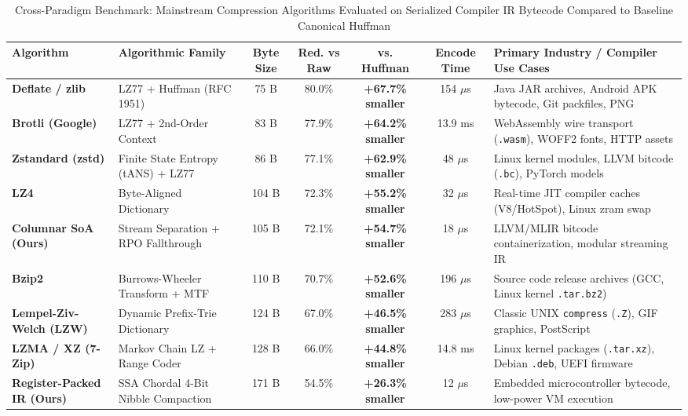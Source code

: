 \documentclass{ieeeaccess}
\begin{document}
\begin{table}[t]
\caption{Cross-Paradigm Benchmark: Mainstream Compression Algorithms Evaluated on Serialized Compiler IR Bytecode Compared to Baseline Canonical Huffman}
\label{tab:compression_comparison}
\centering
\begin{tabularx}{\textwidth}{l l c c c c X}
\toprule
\textbf{Algorithm} & \textbf{Algorithmic Family} & \textbf{Byte Size} & \textbf{Red. vs Raw} & \textbf{vs. Huffman} & \textbf{Encode Time} & \textbf{Primary Industry / Compiler Use Cases} \\
\midrule
\textbf{Deflate / zlib} & LZ77 + Huffman (RFC 1951) & 75 B & 80.0\% & \textbf{+67.7\% smaller} & 154 $\mu$s & Java JAR archives, Android APK bytecode, Git packfiles, PNG \\
\textbf{Brotli (Google)} & LZ77 + 2nd-Order Context & 83 B & 77.9\% & \textbf{+64.2\% smaller} & 13.9 ms & WebAssembly wire transport (\texttt{.wasm}), WOFF2 fonts, HTTP assets \\
\textbf{Zstandard (zstd)} & Finite State Entropy (tANS) + LZ77 & 86 B & 77.1\% & \textbf{+62.9\% smaller} & 48 $\mu$s & Linux kernel modules, LLVM bitcode (\texttt{.bc}), PyTorch models \\
\textbf{LZ4} & Byte-Aligned Dictionary & 104 B & 72.3\% & \textbf{+55.2\% smaller} & 32 $\mu$s & Real-time JIT compiler caches (V8/HotSpot), Linux zram swap \\
\textbf{Columnar SoA (Ours)} & Stream Separation + RPO Fallthrough & 105 B & 72.1\% & \textbf{+54.7\% smaller} & 18 $\mu$s & LLVM/MLIR bitcode containerization, modular streaming IR \\
\textbf{Bzip2} & Burrows-Wheeler Transform + MTF & 110 B & 70.7\% & \textbf{+52.6\% smaller} & 196 $\mu$s & Source code release archives (GCC, Linux kernel \texttt{.tar.bz2}) \\
\textbf{Lempel-Ziv-Welch (LZW)} & Dynamic Prefix-Trie Dictionary & 124 B & 67.0\% & \textbf{+46.5\% smaller} & 283 $\mu$s & Classic UNIX \texttt{compress} (\texttt{.Z}), GIF graphics, PostScript \\
\textbf{LZMA / XZ (7-Zip)} & Markov Chain LZ + Range Coder & 128 B & 66.0\% & \textbf{+44.8\% smaller} & 14.8 ms & Linux kernel packages (\texttt{.tar.xz}), Debian \texttt{.deb}, UEFI firmware \\
\textbf{Register-Packed IR (Ours)} & SSA Chordal 4-Bit Nibble Compaction & 171 B & 54.5\% & \textbf{+26.3\% smaller} & 12 $\mu$s & Embedded microcontroller bytecode, low-power VM execution \\

\end{tabularx}
\end{table}
\end{document}
